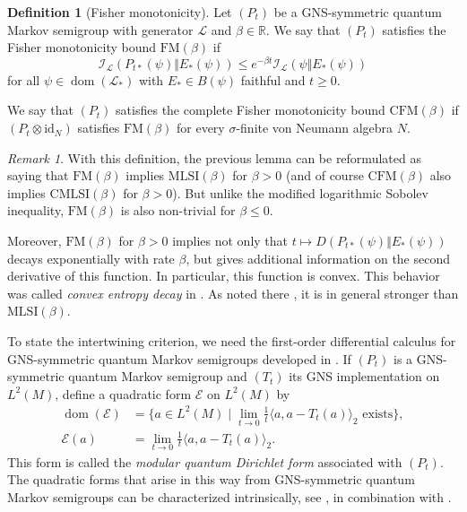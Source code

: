 \documentclass[12pt,a4paper]{amsart}
\newcommand{\1}{\mathds{1}}
\newcommand{\E}{\mathcal E}
\newcommand{\I}{\mathcal I}
\renewcommand{\L}{\mathcal L}
\newcommand{\IR}{\mathbb R}
\newcommand{\dom}{\operatorname{dom}}
\newcommand{\id}{\mathrm{id}}
\theoremstyle{plain}
\theoremstyle{definition}
\newtheorem{definition}[proposition]{Definition}
\theoremstyle{remark}
\newtheorem{remark}[proposition]{Remark}
\begin{document}
\begin{definition}[Fisher monotonicity]
Let $(P_t)$ be a GNS-symmetric quantum Markov semigroup with generator $\L$ and $\beta\in\IR$. We say that $(P_t)$ satisfies the Fisher monotonicity bound $\mathrm{FM}(\beta)$ if 
\begin{equation*}
\I_\L(P_{t\ast}(\psi)\Vert E_\ast(\psi))\leq e^{-\beta t}\I_\L(\psi\Vert E_\ast(\psi))
\end{equation*}
for all $\psi\in\dom(\L_\ast)$ with $E_\ast\in B(\psi)$ faithful and $t\geq 0$.

We say that $(P_t)$ satisfies the complete Fisher monotonicity bound $\mathrm{CFM}(\beta)$ if $(P_t\otimes\id_N)$ satisfies $\mathrm{FM}(\beta)$ for every $\sigma$-finite von Neumann algebra $N$.
\end{definition}

\begin{remark}
With this definition, the previous lemma can be reformulated as saying that $\mathrm{FM}(\beta)$ implies $\mathrm{MLSI}(\beta)$ for $\beta>0$ (and of course $\mathrm{CFM}(\beta)$ also implies $\mathrm{CMLSI}(\beta)$ for $\beta>0$). But unlike the modified logarithmic Sobolev inequality, $\mathrm{FM}(\beta)$ is also non-trivial for $\beta\leq 0$.

Moreover, $\mathrm{FM}(\beta)$ for $\beta>0$ implies not only that $t\mapsto D(P_{t\ast}(\psi)\Vert E_\ast(\psi))$ decays exponentially with rate $\beta$, but gives additional information on the second derivative of this function. In particular, this function is convex. This behavior was called \emph{convex entropy decay} in \cite{CDP09}. As noted there \cite[Remark 2.2]{CDP09}, it is in general stronger than $\mathrm{MLSI}(\beta)$.
\end{remark}

To state the intertwining criterion, we need the first-order differential calculus for GNS-symmetric quantum Markov semigroups developed in \cite{Wir22b,Wir24}. If $(P_t)$ is a GNS-symmetric quantum Markov semigroup and $(T_t)$ its GNS implementation on $L^2(M)$, define a quadratic form $\E$ on $L^2(M)$ by
\begin{align*}
    \dom(\E)&=\{a\in L^2(M)\mid \lim_{t\to 0}\frac 1 t\langle a,a-T_t(a)\rangle_2\text{ exists}\},\\
    \E(a)&=\lim_{t\to 0}\frac 1 t \langle a,a-T_t(a)\rangle_2.
\end{align*}
This form is called the \emph{modular quantum Dirichlet form} associated with $(P_t)$. The quadratic forms that arise in this way from GNS-symmetric quantum Markov semigroups can be characterized intrinsically, see \cite[Theorem 4.11]{Cip97}, \cite[Theorem 5.7]{GL95} in combination with \cite[Section 3]{Wir22b}.
\end{document}
